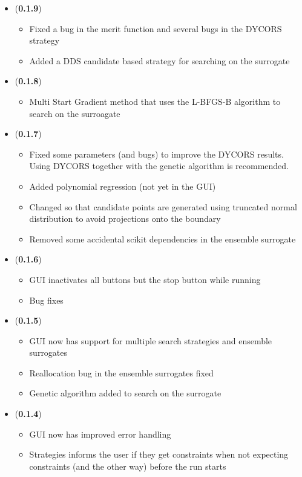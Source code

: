 \documentclass[]{article}
\begin{document}
\begin{itemize}
\item (\textbf{0.1.9}) 
\begin{itemize}
\item Fixed a bug in the merit function and several bugs in the DYCORS strategy
\item Added a DDS candidate based strategy for searching on the surrogate
\end{itemize}

\item (\textbf{0.1.8}) 
\begin{itemize}
\item Multi Start Gradient method that uses the L-BFGS-B algorithm to search on the surroagate
\end{itemize}

\item (\textbf{0.1.7}) 
\begin{itemize}
\item Fixed some parameters (and bugs) to improve the DYCORS results. Using DYCORS together with the genetic algorithm is recommended.
\item Added polynomial regression (not yet in the GUI)
\item Changed so that candidate points are generated using truncated normal distribution to avoid projections onto the boundary
\item Removed some accidental scikit dependencies in the ensemble surrogate
\end{itemize}

\item (\textbf{0.1.6}) 
\begin{itemize}
\item GUI inactivates all buttons but the stop button while running
\item Bug fixes
\end{itemize}

\item (\textbf{0.1.5}) 
\begin{itemize}
\item GUI now has support for multiple search strategies and ensemble surrogates
\item Reallocation bug in the ensemble surrogates fixed
\item Genetic algorithm added to search on the surrogate
\end{itemize}

\item (\textbf{0.1.4}) 
\begin{itemize}
\item GUI now has improved error handling 
\item Strategies informs the user if they get constraints when not expecting constraints (and the other way) before the run starts
\end{itemize}


\end{itemize}
\end{document}
